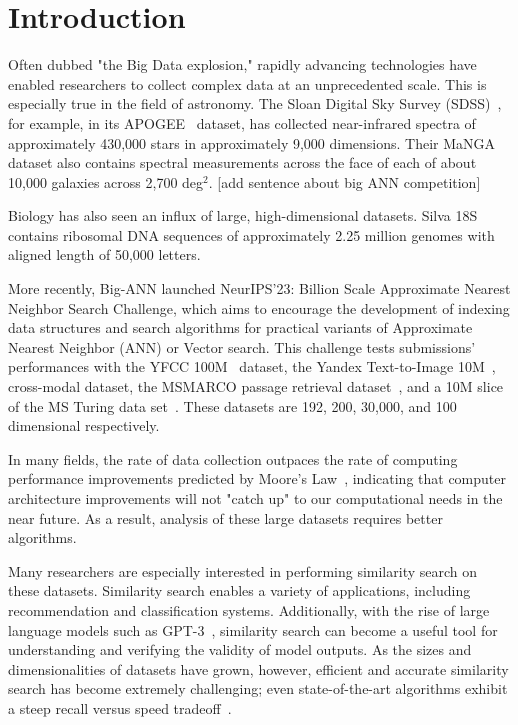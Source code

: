 \section{Introduction}
\label{sec:introduction}
Often dubbed "the Big Data explosion," rapidly advancing technologies have enabled researchers to collect complex data at an unprecedented scale. 
This is especially true in the field of astronomy. 
The Sloan Digital Sky Survey (SDSS)~\cite{blanton2017sdss}, for example, in its APOGEE~\cite{alam2015eleventh} dataset, has collected near-infrared spectra of approximately 430,000 stars in approximately 9,000 dimensions. 
Their MaNGA dataset also contains spectral measurements across the face of each of about 10,000 galaxies across 2,700 deg$^2$. [add sentence about big ANN competition]

Biology has also seen an influx of large, high-dimensional datasets. Silva 18S~\cite{10.1093/nar/gks1219} contains ribosomal DNA sequences of approximately 2.25 
million genomes with aligned length of 50,000 letters. 


More recently, Big-ANN launched NeurIPS'23: Billion Scale Approximate Nearest Neighbor Search Challenge, 
which aims to encourage the development of indexing data structures and search algorithms for practical variants of Approximate Nearest Neighbor (ANN) or Vector search.
This challenge tests submissions' performances with the YFCC 100M~\cite{johnson2019billion} dataset, the Yandex Text-to-Image 10M~\cite{diskann-github}, cross-modal dataset, 
the MSMARCO passage retrieval dataset~\cite{Bruch2023AnAA}, and a 10M slice of the MS Turing data set~\cite{Singh2021FreshDiskANNAF}. These datasets 
are 192, 200, 30,000, and 100 dimensional respectively.


In many fields, the rate of data collection outpaces the rate of computing performance improvements predicted by Moore's Law~\cite{brescia2012extracting}, indicating 
that computer architecture improvements will not "catch up" to our computational needs in the near future. As a result, analysis of these large datasets 
requires better algorithms. 

Many researchers are especially interested in performing similarity search on these datasets. 
Similarity search enables a variety of applications, including recommendation and classification systems. 
Additionally, with the rise of large language models such as GPT-3~\cite{2020arXiv200514165B}, similarity search can become a useful tool for 
understanding and verifying the validity of model outputs. 
As the sizes and dimensionalities of datasets have grown, however, efficient and accurate similarity search has become extremely challenging; 
even state-of-the-art algorithms exhibit a steep recall versus speed tradeoff~\cite{ishaq2019clustered}.


